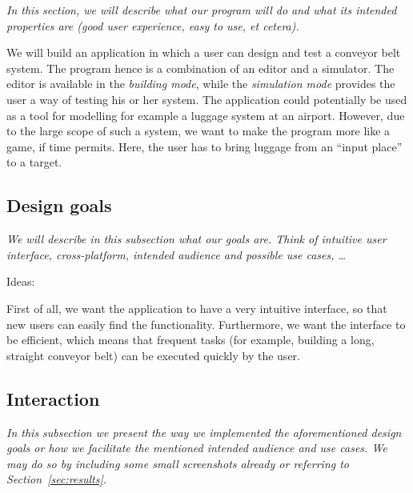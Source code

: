 \textit{In this section, we will describe what our program will do and what its intended properties are (good user experience, easy to use, et cetera).}

We will build an application in which a user can design and test a conveyor belt system. The program hence is a combination of an editor and a simulator. The editor is available in the \textit{building mode}, while the \textit{simulation mode} provides the user a way of testing his or her system. The application could potentially be used as a tool for modelling for example a luggage system at an airport. However, due to the large scope of such a system, we want to make the program more like a game, if time permits. Here, the user has to bring luggage from an ``input place'' to a target.

\subsection{Design goals}
\textit{We will describe in this subsection what our goals are. Think of intuitive user interface, cross-platform, intended audience and possible use cases, \ldots}

Ideas:

First of all, we want the application to have a very intuitive interface, so that new users can easily find the functionality. Furthermore, we want the interface to be efficient, which means that frequent tasks (for example, building a long, straight conveyor belt) can be executed quickly by the user.

\subsection{Interaction}
\textit{In this subsection we present the way we implemented the aforementioned design goals or how we facilitate the mentioned intended audience and use cases. We may do so by including some small screenshots already or referring to Section~\ref{sec:results}.}